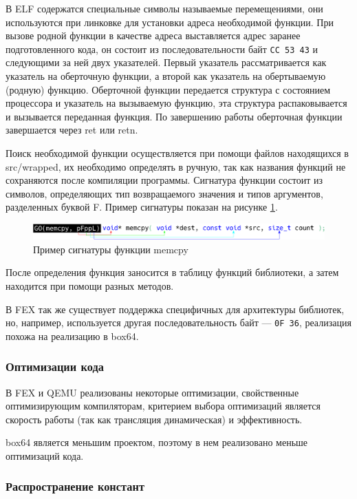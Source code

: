 В ELF содержатся специальные символы называемые перемещениями, они используются при линковке для установки адреса необходимой функции. При вызове родной функции в качестве адреса выставляется адрес заранее подготовленного кода, он состоит из последовательности байт \texttt{CC 53 43} и следующими за ней двух указателей. Первый указатель рассматривается как указатель на оберточную функции, а второй как указатель на обертываемую (родную) функцию. Оберточной функции передается структура с состоянием процессора и указатель на вызываемую функцию, эта структура распаковывается и вызывается переданная функция. По завершению работы оберточная функции завершается через ret или retn.

Поиск необходимой функции осуществляется при помощи файлов находящихся в src/wrapped, их необходимо определять в ручную, так как названия функций не сохраняются после компиляции программы. Сигнатура функции состоит из символов, определяющих тип возвращаемого значения и типов аргументов, разделенных буквой F. Пример сигнатуры показан на рисунке \ref{fig:box64sig}.

\begin{figure}[hbtp]
	\centering
	\includegraphics[width=\textwidth]{img/function.eps}
	\caption{Пример сигнатуры функции memcpy}
	\label{fig:box64sig}
\end{figure}

После определения функция заносится в таблицу функций библиотеки, а затем находится при помощи разных методов. \cite{box64_deep}

В FEX так же существует поддержка специфичных для архитектуры библиотек, но, например, используется другая последовательность байт --- \texttt{0F 36}, реализация похожа на реализацию в box64.

\subsubsection{Оптимизации кода}

В FEX и QEMU реализованы некоторые оптимизации, свойственные оптимизирующим компиляторам, критерием выбора оптимизаций является скорость работы (так как трансляция динамическая) и эффективность.

box64 является меньшим проектом, поэтому в нем реализовано меньше оптимизаций кода.

\subsubsection{Распространение констант}

